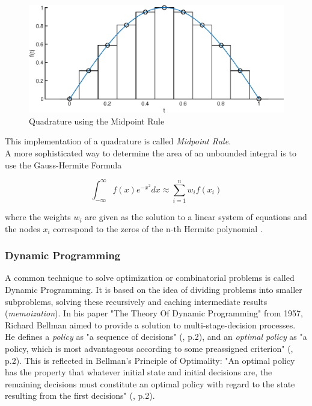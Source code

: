 \documentclass[12pt, a4paper, oneside]{article}
\begin{document}
	\begin{figure}[ht] 
		\includegraphics[width=1\textwidth]{figures/quadratureA.eps}
		\caption{Quadrature using the Midpoint Rule}
		\label{fig:quadrature-a}
	\end{figure}
This implementation of a quadrature is called \emph{Midpoint Rule}. 
\\

A more sophisticated way to determine the area of an unbounded integral is to use the Gauss-Hermite Formula

	\begin{equation}
	\int_{-\infty}^{\infty} f(x)e^{-x^2} dx \approx \sum_{i=1}^{n}{w_if(x_i)}
	\end{equation}

where the weights $w_i$ are given as the solution to a linear system of equations and the nodes $x_i$ correspond to the zeros of the n-th Hermite polynomial \citep{seminar:week6}.

\subsubsection{Dynamic Programming}

A common technique to solve optimization or combinatorial problems is called Dynamic Programming. 
It is based on the idea of dividing problems into smaller subproblems, solving these recursively and caching intermediate results (\textit{memoization}). %
In his paper "The Theory Of Dynamic Programming" from 1957, Richard Bellman aimed to provide a solution to multi-stage-decision processes. 
He defines a \textit{policy} as "a sequence of decisions" (\cite{bellman:1957}, p.2), and an \textit{optimal policy} as "a policy, which is most advantageous according to some preassigned criterion" (\cite{bellman:1957}, p.2). 
This is reflected in Bellman's Principle of Optimality: "An optimal policy has the property that whatever initial state and initial decisions are, the remaining decisions must constitute an optimal policy with regard to the state resulting from the first decisions" (\cite{bellman:1957}, p.2). 
\end{document}
